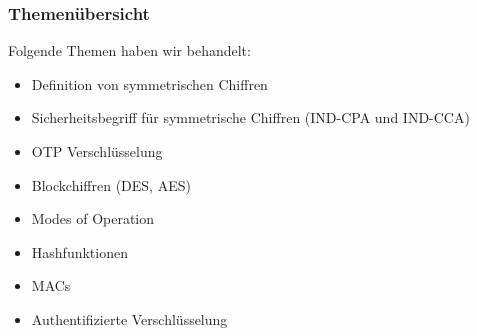\subsubsection*{Themenübersicht}
Folgende Themen haben wir behandelt:
\begin{itemize}
    \item Definition von symmetrischen Chiffren
    \item Sicherheitsbegriff für symmetrische Chiffren (IND-CPA und IND-CCA)
    \item OTP Verschlüsselung
    \item Blockchiffren (DES, AES)
    \item Modes of Operation
    \item Hashfunktionen
    \item MACs
    \item Authentifizierte Verschlüsselung
\end{itemize}